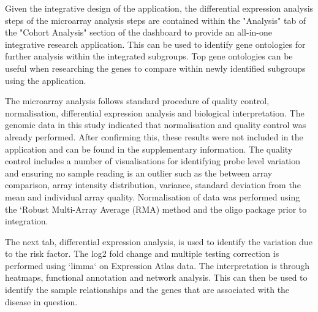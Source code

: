\documentclass{bioinfo}
\begin{document}
Given the integrative design of the application, the differential expression analysis steps of the microarray analysis steps are contained within the "Analysis" tab of the "Cohort Analysis" section of the dashboard to provide an all-in-one integrative research application. This can be used to identify gene ontologies for further analysis within the integrated subgroups.
Top gene ontologies can be useful when researching the genes to compare within newly identified subgroups using the application. 

The microarray analysis follows standard procedure of quality control, normalisation, differential expression analysis and biological interpretation. The genomic data in this study indicated that normalisation and quality control was already performed. After confirming this, these results were not included in the application and can be found in the supplementary information. The quality control includes a number of visualisations for identifying probe level variation and ensuring no sample reading is an outlier such as the between array comparison, array intensity distribution, variance, standard deviation from the mean and individual array quality. Normalisation of data was performed using the ‘Robust Multi-Array Average (RMA) method and the oligo package prior to integration.

The next tab, differential expression analysis, is used to identify the variation due to the risk factor. The log2 fold change and multiple testing correction is performed using ‘limma` on Expression Atlas data. The interpretation is through heatmaps, functional annotation and network analysis. This can then be used to identify the sample relationships and the genes that are associated with the disease in question.
\end{document}
